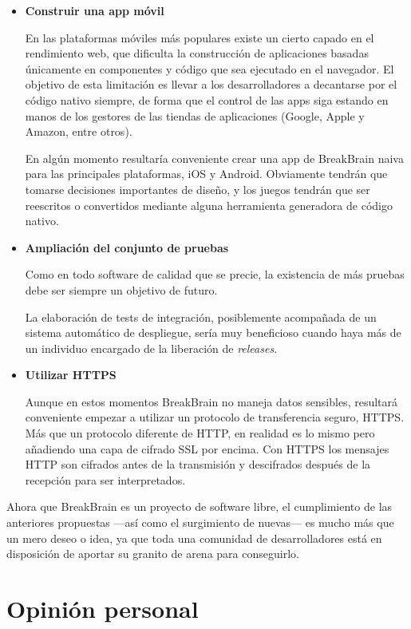 \begin{itemize}
\item {\bf Construir una app móvil}

En las plataformas móviles más populares existe un cierto capado en el rendimiento web, que dificulta la construcción de aplicaciones basadas únicamente en componentes y código que sea ejecutado en el navegador. El objetivo de esta limitación es llevar a los desarrolladores a decantarse por el código nativo siempre, de forma que el control de las apps siga estando en manos de los gestores de las tiendas de aplicaciones (Google, Apple y Amazon, entre otros).

En algún momento resultaría conveniente crear una app de BreakBrain naiva para las principales plataformas, iOS y Android. Obviamente tendrán que tomarse decisiones importantes de diseño, y los juegos tendrán que ser reescritos o convertidos mediante alguna herramienta generadora de código nativo.

\item {\bf Ampliación del conjunto de pruebas}

Como en todo software de calidad que se precie, la existencia de más pruebas debe ser siempre un objetivo de futuro.

La elaboración de tests de integración, posiblemente acompañada de un sistema automático de despliegue, sería muy beneficioso cuando haya más de un individuo encargado de la liberación de {\it releases}.

\item {\bf Utilizar \acf{HTTPS}}

Aunque en estos momentos BreakBrain no maneja datos sensibles, resultará conveniente empezar a utilizar un protocolo de transferencia seguro, \acs{HTTPS}. Más que un protocolo diferente de \acs{HTTP}, en realidad es lo mismo pero añadiendo una capa de cifrado \acf{SSL} por encima. Con \acs{HTTPS} los mensajes \acs{HTTP} son cifrados antes de la transmisión y descifrados después de la recepción para ser interpretados.

\end{itemize}

Ahora que BreakBrain es un proyecto de software libre, el cumplimiento de las anteriores propuestas ---así como el surgimiento de nuevas--- es mucho más que un mero deseo o idea, ya que toda una comunidad de desarrolladores está en disposición de aportar su granito de arena para conseguirlo.

\section{Opinión personal}


